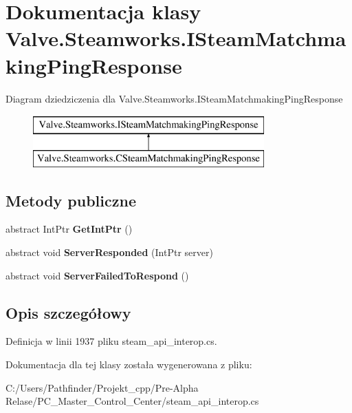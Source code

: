 \hypertarget{class_valve_1_1_steamworks_1_1_i_steam_matchmaking_ping_response}{}\section{Dokumentacja klasy Valve.\+Steamworks.\+I\+Steam\+Matchmaking\+Ping\+Response}
\label{class_valve_1_1_steamworks_1_1_i_steam_matchmaking_ping_response}
Diagram dziedziczenia dla Valve.\+Steamworks.\+I\+Steam\+Matchmaking\+Ping\+Response\begin{figure}[H]
\begin{center}
\leavevmode
\includegraphics[height=2.000000cm]{class_valve_1_1_steamworks_1_1_i_steam_matchmaking_ping_response}
\end{center}
\end{figure}
\subsection*{Metody publiczne}
\begin{DoxyCompactItemize}
\item 
\mbox{\label{class_valve_1_1_steamworks_1_1_i_steam_matchmaking_ping_response_aea9bf1546f658a3dd7ea97ebcca4516e}} 
abstract Int\+Ptr {\bfseries Get\+Int\+Ptr} ()
\item 
\mbox{\label{class_valve_1_1_steamworks_1_1_i_steam_matchmaking_ping_response_a2f0dedcbca0fb74b30033c881528baff}} 
abstract void {\bfseries Server\+Responded} (Int\+Ptr server)
\item 
\mbox{\label{class_valve_1_1_steamworks_1_1_i_steam_matchmaking_ping_response_a001ef9f38ad2d59400af77ec2a259087}} 
abstract void {\bfseries Server\+Failed\+To\+Respond} ()
\end{DoxyCompactItemize}


\subsection{Opis szczegółowy}


Definicja w linii 1937 pliku steam\+\_\+api\+\_\+interop.\+cs.



Dokumentacja dla tej klasy została wygenerowana z pliku\+:\begin{DoxyCompactItemize}
\item 
C\+:/\+Users/\+Pathfinder/\+Projekt\+\_\+cpp/\+Pre-\/\+Alpha Relase/\+P\+C\+\_\+\+Master\+\_\+\+Control\+\_\+\+Center/steam\+\_\+api\+\_\+interop.\+cs\end{DoxyCompactItemize}
